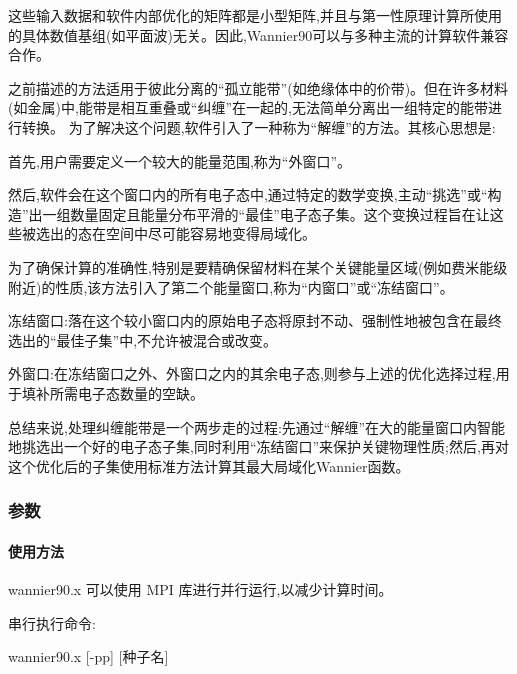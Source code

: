 \documentclass[lang=cn,scheme=chinese,color=blue,device=normal,toc=onecol,math=cm]{elegantbook}
\begin{document}
这些输入数据和软件内部优化的矩阵都是小型矩阵,并且与第一性原理计算所使用的具体数值基组(如平面波)无关。因此,Wannier90可以与多种主流的计算软件兼容合作。\par


之前描述的方法适用于彼此分离的“孤立能带”(如绝缘体中的价带)。但在许多材料(如金属)中,能带是相互重叠或“纠缠”在一起的,无法简单分离出一组特定的能带进行转换。 为了解决这个问题,软件引入了一种称为“解缠”的方法。其核心思想是:\par


首先,用户需要定义一个较大的能量范围,称为“外窗口”。\par


然后,软件会在这个窗口内的所有电子态中,通过特定的数学变换,主动“挑选”或“构造”出一组数量固定且能量分布平滑的“最佳”电子态子集。这个变换过程旨在让这些被选出的态在空间中尽可能容易地变得局域化。\par


为了确保计算的准确性,特别是要精确保留材料在某个关键能量区域(例如费米能级附近)的性质,该方法引入了第二个能量窗口,称为“内窗口”或“冻结窗口”。\par


冻结窗口:落在这个较小窗口内的原始电子态将原封不动、强制性地被包含在最终选出的“最佳子集”中,不允许被混合或改变。\par


外窗口:在冻结窗口之外、外窗口之内的其余电子态,则参与上述的优化选择过程,用于填补所需电子态数量的空缺。\par


总结来说,处理纠缠能带是一个两步走的过程:先通过“解缠”在大的能量窗口内智能地挑选出一个好的电子态子集,同时利用“冻结窗口”来保护关键物理性质;然后,再对这个优化后的子集使用标准方法计算其最大局域化Wannier函数。\par


\subsubsection{参数}


\paragraph{使用方法}


wannier90.x 可以使用 MPI 库进行并行运行,以减少计算时间。\par


串行执行命令:\par


wannier90.x [-pp] [种子名]\par
\end{document}
